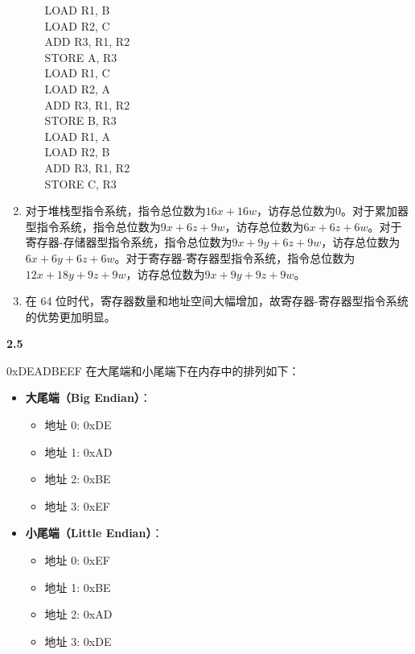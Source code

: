 \documentclass[UTF8]{article}
\newcommand{\tbf}[1]{\textbf{#1}}
\begin{document}
\begin{enumerate}[label=(\arabic*)]
\begin{enumerate}
        LOAD R1, B \\
        LOAD R2, C \\
        ADD R3, R1, R2 \\
        STORE A, R3 \\
        LOAD R1, C \\
        LOAD R2, A \\
        ADD R3, R1, R2 \\
        STORE B, R3 \\
        LOAD R1, A \\
        LOAD R2, B \\
        ADD R3, R1, R2 \\
        STORE C, R3
    \end{enumerate}

    \item 对于堆栈型指令系统，指令总位数为$16x + 16w$，访存总位数为0。对于累加器型指令系统，指令总位数为$9x + 6z + 9w$，访存总位数为$6x + 6z + 6w$。对于寄存器-存储器型指令系统，指令总位数为$9x + 9y + 6z + 9w$，访存总位数为$6x + 6y + 6z + 6w$。对于寄存器-寄存器型指令系统，指令总位数为$12x + 18y + 9z + 9w$，访存总位数为$9x + 9y + 9z + 9w$。
    \item 在 64 位时代，寄存器数量和地址空间大幅增加，故寄存器-寄存器型指令系统的优势更加明显。
\end{enumerate}

\tbf{2.5}

0xDEADBEEF 在大尾端和小尾端下在内存中的排列如下：
\begin{itemize}
    \item \textbf{大尾端（Big Endian）}：
    \begin{itemize}
        \item 地址 0: 0xDE
        \item 地址 1: 0xAD
        \item 地址 2: 0xBE
        \item 地址 3: 0xEF
    \end{itemize}
    \item \textbf{小尾端（Little Endian）}：
    \begin{itemize}
        \item 地址 0: 0xEF
        \item 地址 1: 0xBE
        \item 地址 2: 0xAD
        \item 地址 3: 0xDE
    \end{itemize}
\end{itemize}
\end{document}
